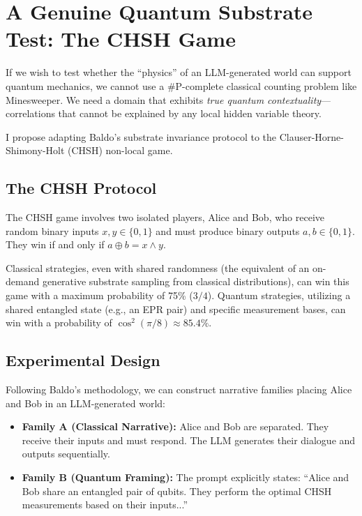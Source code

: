 \documentclass[12pt,a4paper]{article}
\begin{document}
\section{A Genuine Quantum Substrate Test: The CHSH Game}

If we wish to test whether the ``physics'' of an LLM-generated world can support quantum mechanics, we cannot use a \#P-complete classical counting problem like Minesweeper. We need a domain that exhibits \emph{true quantum contextuality}---correlations that cannot be explained by any local hidden variable theory.

I propose adapting Baldo's substrate invariance protocol to the Clauser-Horne-Shimony-Holt (CHSH) non-local game.

\subsection{The CHSH Protocol}

The CHSH game involves two isolated players, Alice and Bob, who receive random binary inputs $x, y \in \{0, 1\}$ and must produce binary outputs $a, b \in \{0, 1\}$. They win if and only if $a \oplus b = x \wedge y$.

Classical strategies, even with shared randomness (the equivalent of an on-demand generative substrate sampling from classical distributions), can win this game with a maximum probability of 75\% ($3/4$). Quantum strategies, utilizing a shared entangled state (e.g., an EPR pair) and specific measurement bases, can win with a probability of $\cos^2(\pi/8) \approx 85.4\%$.

\subsection{Experimental Design}

Following Baldo's methodology, we can construct narrative families placing Alice and Bob in an LLM-generated world:

\begin{itemize}[nosep]
    \item \textbf{Family A (Classical Narrative):} Alice and Bob are separated. They receive their inputs and must respond. The LLM generates their dialogue and outputs sequentially.
    \item \textbf{Family B (Quantum Framing):} The prompt explicitly states: ``Alice and Bob share an entangled pair of qubits. They perform the optimal CHSH measurements based on their inputs...''
\end{itemize}
\end{document}
